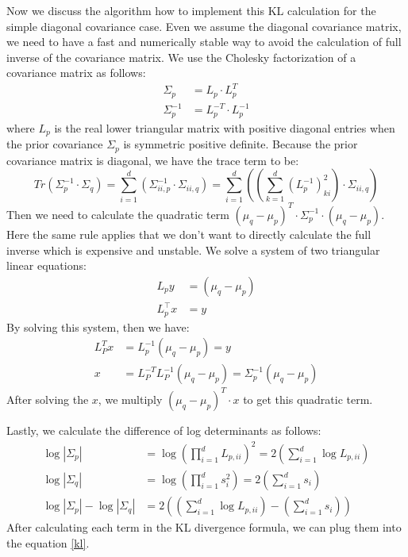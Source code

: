 \documentclass{article}
\begin{document}
Now we discuss the algorithm how to implement this KL calculation for the simple diagonal covariance case. Even we assume the diagonal covariance matrix, we need to have a fast and numerically stable way to avoid the calculation of full inverse of the covariance matrix. We use the Cholesky factorization of a covariance matrix as follows:
$$\begin{aligned}
    \Sigma_p &= L_p\cdot L^T_p \\
    \Sigma_p^{-1} &= L_p^{-T}\cdot L_p^{-1}
\end{aligned}$$
where $L_p$ is the real lower triangular matrix with positive diagonal entries when the prior covariance $\Sigma_p$ is symmetric positive definite. Because the prior covariance matrix is diagonal, we have the trace term to be:
$$
Tr(\Sigma_p^{-1}\cdot\Sigma_q)=\sum_{i=1}^{d} \left(\Sigma^{-1}_{ii,p}\cdot \Sigma_{ii,q}\right) =
\sum_{i=1}^{d} \left(\left(\sum_{k=1}^d(L_p^{-1})^2_{ki} \right) \cdot \Sigma_{ii,q}\right)
$$
Then we need to calculate the quadratic term $(\mu_q-\mu_p)^T\cdot\Sigma_p^{-1}\cdot(\mu_q-\mu_p)$. Here the same rule applies that we don't want to directly calculate the full inverse which is expensive and unstable. We solve a system of two triangular linear equations:
$$
\begin{aligned}
L_p y &=\left(\mu_q-\mu_p\right) \\
L_p^{\top} x &= y
\end{aligned}
$$By solving this system, then we have:
$$
\begin{aligned}
    L_P^Tx &= L_p^{-1}(\mu_q-\mu_p) = y\\
    x &= L_P^{-T}L_P^{-1}(\mu_q-\mu_p) = \Sigma^{-1}_p(\mu_q-\mu_p)
\end{aligned}
$$
After solving the $x$, we multiply $(\mu_q-\mu_p)^T\cdot x$ to get this quadratic term. 

Lastly, we calculate the difference of log determinants as follows:
$$
\begin{aligned}
    \log|\Sigma_p| &= \log\left(\prod_{i=1}^{d}L_{p,ii}\right)^2=2\left(\sum_{i=1}^{d}\log L_{p,ii}\right)\\
    \log|\Sigma_q| &= \log \left(\prod_{i=1}^{d}s_i^2\right)=2\left(\sum_{i=1}^{d}s_i\right)\\
    \log|\Sigma_p|-\log|\Sigma_q|&=2\left(\left(\sum_{i=1}^{d}\log L_{p,ii}\right)-\left(\sum_{i=1}^{d}s_i\right)\right)
\end{aligned}
$$
After calculating each term in the KL divergence formula, we can plug them into the equation \ref{kl}. 
\end{document}
